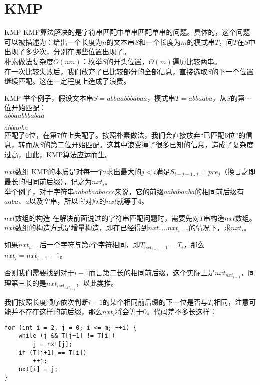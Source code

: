 \documentclass{beamer}
\theoremstyle{compact}
\begin{document}
\section{KMP}
\begin{frame}{KMP}
	KMP算法解决的是字符串匹配中单串匹配单串的问题。具体的，这个问题可以被描述为：给出一个长度为$n$的文本串$S$和一个长度为$m$的模式串$T$，问$T$在$S$中出现了多少次，分别在哪些位置出现了。\\
	
	朴素做法复杂度$O(nm)$：枚举$S$的开头位置，$O(m)$遍历比较两串。\\
	
	在一次比较失败后，我们放弃了已比较部分的全部信息，直接选取$S$的下一个位置继续匹配。这在一定程度上造成了浪费。
	
\end{frame}
\begin{frame}{KMP}
	举个例子，假设文本串$S=abbaabbbabaa$，模式串$T=abbaaba$，从$S$的第一位开始匹配：
	\pause\\
	
	{\color{red} $abbaab$}$bbabaa$
	
	{\color{blue} $abbaab$}$a$
	\pause\\
	
	匹配了$6$位，在第$7$位上失配了。按照朴素做法，我们会直接放弃“已匹配$6$位”的信息，转而从$S$的第二位开始匹配。这其中浪费掉了很多已知的信息，造成了复杂度过高，由此，KMP算法应运而生。
\end{frame}
\begin{frame}{$nxt$数组}
	KMP的本质是对每一个$i$求出最大的$j<i$满足$S_{i-j+1...i}=pre_j$（换言之即最长的相同前后缀），记之为$nxt_i$。\\
	
	举个例子，对于字符串$aababaabaccc$来说，它的前缀$aababaaba$的相同前后缀有$aaba$、$a$以及空串，所以它对应的$nxt$就等于$4$。
	
\end{frame}
\begin{frame}[fragile]{$nxt$数组的构造}
	在解决前面说过的字符串匹配问题时，需要先对$T$串构造$nxt$数组。$nxt$数组的构造方式是增量构造，即在已经得到$nxt_1...nxt_{i-1}$的情况下，求$nxt_i$。
	\pause
	
	如果$nxt_{i-1}$后一个字符与第$i$个字符相同，即$T_{nxt_{i-1}+1}=T_i$，那么$nxt_i=nxt_{i-1}+1$。
	\pause
	
	否则我们需要找到对于$i-1$而言第二长的相同前后缀，这个实际上是$nxt_{nxt_{i-1}}$，同理第三长的是$nxt_{nxt_{nxt_{i-1}}}$，以此类推。
	\pause
	
	我们按照长度顺序依次判断$i-1$的某个相同前后缀的下一位是否与$T_i$相同，注意可能并不存在这样的前后缀，那么$nxt_i$将会等于$0$。\pause 代码差不多长这样：
	
\begin{verbatim}
for (int i = 2, j = 0; i <= m; ++i) {
    while (j && T[j+1] != T[i])
        j = nxt[j];
    if (T[j+1] == T[i])
        ++j;
    nxt[i] = j;
}
\end{verbatim}
	
\end{frame}
\end{document}
